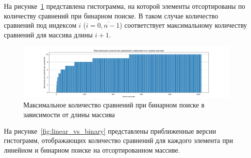 На рисунке~\ref{fig:binary_hist_sorted} представлена гистограмма, на которой элементы отсортированы по количеству сравнений при бинарном поиске. В таком случае количество сравнений под индексом $i$ ($i=\overline{0, n-1}$) соответствует максимальному количеству сравнений для массива длины $i+1$.

\begin{figure}[!htb]
\centering
\includegraphics[width=\textwidth]{img/binary_search_hist_sorted.png}
\caption{Максимальное количество сравнений при бинарном поиске в зависимости от длины массива}
\label{fig:binary_hist_sorted}
\end{figure}

На рисунке~\ref{fig:linear_vs_binary} представлены приближенные версии гистограмм, отображающих количество сравнений для каждого элемента при линейном и бинарном поиске на отсортированном массиве.

